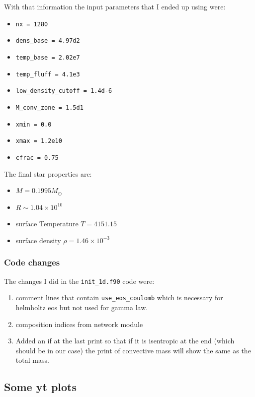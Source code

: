\documentclass[11pt]{article}
\begin{document}
With that information the input parameters that I ended up using were:
\begin{itemize}

	\item {\tt nx = 1280}
	\item {\tt dens\_base = 4.97d2}
	\item {\tt temp\_base = 2.02e7}
	\item {\tt temp\_fluff = 4.1e3}
	\item {\tt low\_density\_cutoff = 1.4d-6}
	\item {\tt M\_conv\_zone = 1.5d1}
	\item {\tt xmin = 0.0}
	\item {\tt xmax = 1.2e10}
	\item {\tt cfrac = 0.75}

\end{itemize}

The final star properties are:
\begin{itemize}
	\item $M = 0.1995 M_\odot$
	\item $R \sim 1.04 \times 10^{10}$
	\item surface Temperature $T = 4151.15$
	\item surface density $\rho = 1.46 \times 10^{-3}$
\end{itemize}

\subsubsection{Code changes}
The changes I did in the {\tt init\_1d.f90} code were: 
\begin{enumerate}
	\item comment lines that contain {\tt use\_eos\_coulomb} which is necessary for helmholtz eos but not used for gamma law.
	
	\item composition indices from network module 
	\item Added an if at the last print so that if it is isentropic at the end (which should be in our case) the print of convective mass will show the same as the total mass.  
\end{enumerate}


\subsection{Some yt plots}
\end{document}
